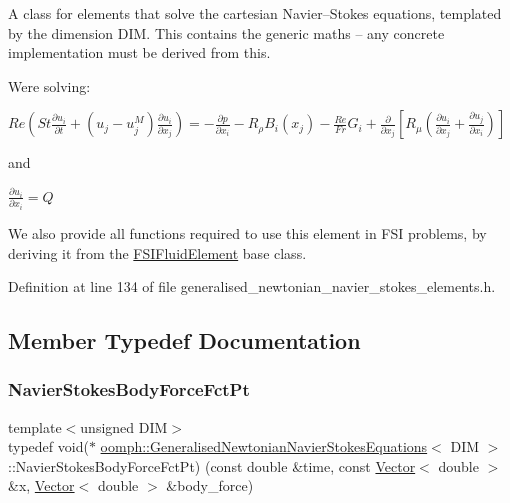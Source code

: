 A class for elements that solve the cartesian Navier--Stokes equations, templated by the dimension D\+IM. This contains the generic maths -- any concrete implementation must be derived from this.

We\textquotesingle{}re solving\+:

$ { Re \left( St \frac{\partial u_i}{\partial t} + (u_j - u_j^{M}) \frac{\partial u_i}{\partial x_j} \right) = - \frac{\partial p}{\partial x_i} - R_\rho B_i(x_j) - \frac{Re}{Fr} G_i + \frac{\partial }{\partial x_j} \left[ R_\mu \left( \frac{\partial u_i}{\partial x_j} + \frac{\partial u_j}{\partial x_i} \right) \right] } $

and

$ { \frac{\partial u_i}{\partial x_i} = Q } $

We also provide all functions required to use this element in F\+SI problems, by deriving it from the \hyperlink{classoomph_1_1FSIFluidElement}{F\+S\+I\+Fluid\+Element} base class. 

Definition at line 134 of file generalised\+\_\+newtonian\+\_\+navier\+\_\+stokes\+\_\+elements.\+h.



\subsection{Member Typedef Documentation}
\mbox{\label{classoomph_1_1GeneralisedNewtonianNavierStokesEquations_a0076b2b1b6ad17d306907c959b3f4d12}} 
\subsubsection{\texorpdfstring{Navier\+Stokes\+Body\+Force\+Fct\+Pt}{NavierStokesBodyForceFctPt}}
{\footnotesize\ttfamily template$<$unsigned D\+IM$>$ \\
typedef void($\ast$ \hyperlink{classoomph_1_1GeneralisedNewtonianNavierStokesEquations}{oomph\+::\+Generalised\+Newtonian\+Navier\+Stokes\+Equations}$<$ D\+IM $>$\+::Navier\+Stokes\+Body\+Force\+Fct\+Pt) (const double \&time, const \hyperlink{classoomph_1_1Vector}{Vector}$<$ double $>$ \&x, \hyperlink{classoomph_1_1Vector}{Vector}$<$ double $>$ \&body\+\_\+force)}



